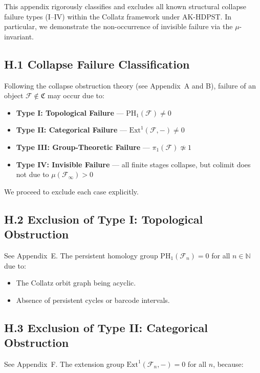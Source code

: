 \documentclass[11pt]{article}
\begin{document}
This appendix rigorously classifies and excludes all known structural collapse failure types (I–IV) within the Collatz framework under AK-HDPST. In particular, we demonstrate the non-occurrence of invisible failure via the \( \mu \)-invariant.

\subsection*{H.1 Collapse Failure Classification}

Following the collapse obstruction theory (see Appendix~A and B), failure of an object \( \mathcal{F} \notin \mathfrak{C} \) may occur due to:

\begin{itemize}
  \item \textbf{Type I: Topological Failure} — \( \mathrm{PH}_1(\mathcal{F}) \neq 0 \)
  \item \textbf{Type II: Categorical Failure} — \( \mathrm{Ext}^1(\mathcal{F}, -) \neq 0 \)
  \item \textbf{Type III: Group-Theoretic Failure} — \( \pi_1(\mathcal{F}) \not\simeq 1 \)
  \item \textbf{Type IV: Invisible Failure} — all finite stages collapse, but colimit does not due to \( \mu(\mathcal{F}_\infty) > 0 \)
\end{itemize}

We proceed to exclude each case explicitly.

\subsection*{H.2 Exclusion of Type I: Topological Obstruction}

See Appendix~E. The persistent homology group \( \mathrm{PH}_1(\mathcal{F}_n) = 0 \) for all \( n \in \mathbb{N} \) due to:

\begin{itemize}
  \item The Collatz orbit graph being acyclic.
  \item Absence of persistent cycles or barcode intervals.
\end{itemize}

\subsection*{H.3 Exclusion of Type II: Categorical Obstruction}

See Appendix~F. The extension group \( \mathrm{Ext}^1(\mathcal{F}_n, -) = 0 \) for all \( n \), because:
\end{document}
